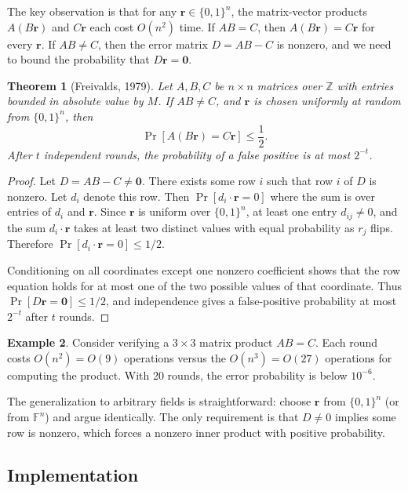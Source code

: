 \documentclass[twoside,12pt]{book}
\theoremstyle{plain}
\newtheorem{theorem}{Theorem}[chapter]
\theoremstyle{definition}
\newtheorem{example}[theorem]{Example}
\theoremstyle{remark}
\begin{document}
The key observation is that for any $\mathbf{r} \in \{0,1\}^n$, the matrix-vector products $A(B\mathbf{r})$ and $C\mathbf{r}$ each cost $O(n^2)$ time. If $AB = C$, then $A(B\mathbf{r}) = C\mathbf{r}$ for every $\mathbf{r}$. If $AB \neq C$, then the error matrix $D = AB - C$ is nonzero, and we need to bound the probability that $D\mathbf{r} = \mathbf{0}$.

\begin{theorem}[Freivalds, 1979]
\label{thm:freivalds}
Let $A, B, C$ be $n \times n$ matrices over $\mathbb{Z}$ with entries bounded in absolute value by $M$. If $AB \neq C$, and $\mathbf{r}$ is chosen uniformly at random from $\{0, 1\}^n$, then
\[
\Pr[A(B\mathbf{r}) = C\mathbf{r}] \leq \frac{1}{2}.
\]
After $t$ independent rounds, the probability of a false positive is at most $2^{-t}$.
\end{theorem}

\begin{proof}
Let $D = AB - C \neq \mathbf{0}$. There exists some row $i$ such that row $i$ of $D$ is nonzero. Let $d_i$ denote this row. Then $\Pr[d_i \cdot \mathbf{r} = 0]$ where the sum is over entries of $d_i$ and $\mathbf{r}$. Since $\mathbf{r}$ is uniform over $\{0,1\}^n$, at least one entry $d_{ij} \neq 0$, and the sum $d_i \cdot \mathbf{r}$ takes at least two distinct values with equal probability as $r_j$ flips. Therefore $\Pr[d_i \cdot \mathbf{r} = 0] \leq 1/2$.

Conditioning on all coordinates except one nonzero coefficient shows that
the row equation holds for at most one of the two possible values of that
coordinate. Thus $\Pr[D\mathbf r=\mathbf 0]\leq 1/2$, and independence gives
a false-positive probability at most $2^{-t}$ after $t$ rounds.
\end{proof}

\begin{example}
\label{ex:freivalds}
Consider verifying a $3 \times 3$ matrix product $AB = C$. Each round costs $O(n^2) = O(9)$ operations versus the $O(n^3) = O(27)$ operations for computing the product. With 20 rounds, the error probability is below $10^{-6}$.
\end{example}

The generalization to arbitrary fields is straightforward: choose $\mathbf{r}$ from $\{0, 1\}^n$ (or from $\mathbb{F}^n$) and argue identically. The only requirement is that $D \neq 0$ implies some row is nonzero, which forces a nonzero inner product with positive probability.

\subsection*{Implementation}
\end{document}
